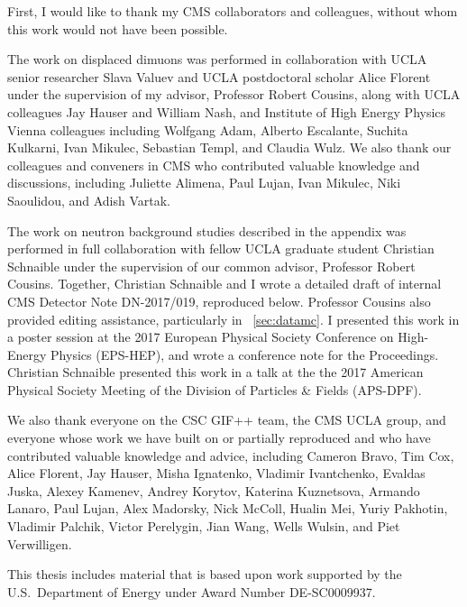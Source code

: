 First, I would like to thank my CMS collaborators and colleagues, without whom this work would not have been possible.

The work on displaced dimuons was performed in collaboration with UCLA senior researcher Slava Valuev and UCLA postdoctoral scholar Alice Florent under the supervision of my advisor, Professor Robert Cousins, along with UCLA colleagues Jay Hauser and William Nash, and Institute of High Energy Physics Vienna colleagues including Wolfgang Adam, Alberto Escalante, Suchita Kulkarni, Ivan Mikulec, Sebastian Templ, and Claudia Wulz.
We also thank our colleagues and conveners in CMS who contributed valuable knowledge and discussions, including Juliette Alimena, Paul Lujan, Ivan Mikulec, Niki Saoulidou, and Adish Vartak.

The work on neutron background studies described in the appendix was performed in full collaboration with fellow UCLA graduate student Christian Schnaible under the supervision of our common advisor, Professor Robert Cousins.
Together, Christian Schnaible and I wrote a detailed draft of internal CMS Detector Note DN-2017/019, reproduced below.
Professor Cousins also provided editing assistance, particularly in \Sec~\ref{sec:datamc}.
I presented this work in a poster session at the 2017 European Physical Society Conference on High-Energy Physics (EPS-HEP), and wrote a conference note for the Proceedings.
Christian Schnaible presented this work in a talk at the the 2017 American Physical Society Meeting of the Division of Particles \& Fields (APS-DPF).

We also thank everyone on the CSC GIF++ team, the CMS UCLA group, and everyone whose work we have built on or partially reproduced and who have contributed valuable knowledge and advice, including Cameron Bravo, Tim Cox, Alice Florent, Jay Hauser, Misha Ignatenko, Vladimir Ivantchenko, Evaldas Juska, Alexey Kamenev, Andrey Korytov, Katerina Kuznetsova, Armando Lanaro, Paul Lujan, Alex Madorsky, Nick McColl, Hualin Mei, Yuriy Pakhotin, Vladimir Palchik, Victor Perelygin, Jian Wang, Wells Wulsin, and Piet Verwilligen.

This thesis includes material that is based upon work supported by the U.S.\ Department of Energy under Award Number {DE}-{SC}0009937.
